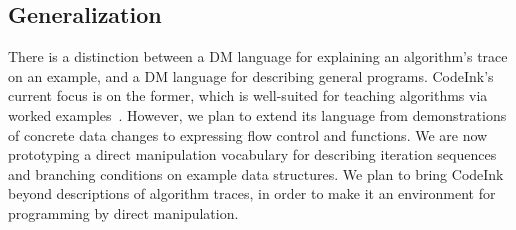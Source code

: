 \subsection{Generalization}
There is a distinction between a DM language for explaining an
algorithm's trace on an example, and a DM language for describing general programs.
CodeInk's current focus is on the former, which is well-suited for teaching
algorithms via worked examples~\cite{Sweller1985}. However, we plan to extend
its language from 
demonstrations of concrete data changes to expressing flow
control and functions.
We are now prototyping a direct manipulation vocabulary for describing iteration
sequences and branching conditions on example data structures. We plan to
bring CodeInk beyond descriptions of algorithm traces, in order to make it an
environment for programming by direct manipulation.




